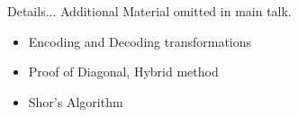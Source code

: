 \appendix
\section{\appendixname}
\begin{frame}{Details...}
  Additional Material omitted in main talk.

  \begin{itemize}
    \item Encoding and Decoding transformations
    \item Proof of Diagonal, Hybrid method
    \item Shor's Algorithm
  \end{itemize}
\end{frame}
